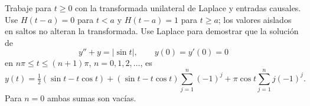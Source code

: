 Trabaje para $t\ge0$ con la transformada unilateral de Laplace y entradas causales. Use $H(t-a)=0$ para $t<a$ y $H(t-a)=1$ para $t\ge a$; los valores aislados en saltos no alteran la transformada. Use Laplace para demostrar que la solución de
\[y''+y=|\sin t|,\qquad y(0)=y'(0)=0\]
en $n\pi\le t\le(n+1)\pi$, $n=0,1,2,\ldots$, es
\[y(t)=\tfrac12(\sin t-t\cos t)+(\sin t-t\cos t)\sum_{j=1}^n(-1)^j+\pi\cos t\sum_{j=1}^n j(-1)^j.\]
Para $n=0$ ambas sumas son vacías.
